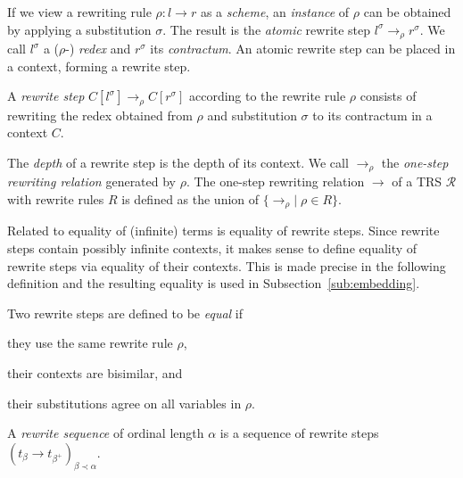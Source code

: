 If we view a rewriting rule $\rho : l \rightarrow r$ as a \emph{scheme}, an
\emph{instance} of $\rho$ can be obtained by applying a substitution
$\sigma$. The result is the \emph{atomic} rewrite step $l^\sigma
\rightarrow_\rho r^\sigma$. We call $l^\sigma$ a ($\rho$-) \emph{redex} and
$r^\sigma$ its \emph{contractum}. An atomic rewrite step can be placed in a
context, forming a rewrite step.

\begin{definition}%
A \emph{rewrite step} $C[l^\sigma] \rightarrow_\rho C[r^\sigma]$ according to
the rewrite rule $\rho$ consists of rewriting the redex obtained from
$\rho$ and substitution $\sigma$ to its contractum in a context $C$.
\end{definition}

The \emph{depth} of a rewrite step is the depth of its context. We
call $\rightarrow_\rho$ the \emph{one-step rewriting relation}
generated by $\rho$. The one-step rewriting relation $\rightarrow$ of
a TRS $\mathcal{R}$ with rewrite rules $R$ is defined as the union of
$\{ \rightarrow_\rho | \; \rho \in R \}$.


Related to equality of (infinite) terms is equality of rewrite
steps. Since rewrite steps contain possibly infinite contexts, it
makes sense to define equality of rewrite steps via equality of their
contexts. This is made precise in the following definition and the
resulting equality is used in Subsection~\ref{sub:embedding}.

\begin{definition}\label{def:stepeq}%
Two rewrite steps are defined to be \emph{equal} if
\begin{compactenum}
  \item they use the same rewrite rule $\rho$,
  \item their contexts are bisimilar, and
  \item their substitutions agree on all variables in $\rho$.
\end{compactenum}
\end{definition}

\begin{definition}\label{def:seq}%
A \emph{rewrite sequence} of ordinal length $\alpha$ is a sequence of rewrite
steps $(t_\beta \rightarrow t_{\beta^+})_{\beta \prec \alpha}$.
\end{definition}

